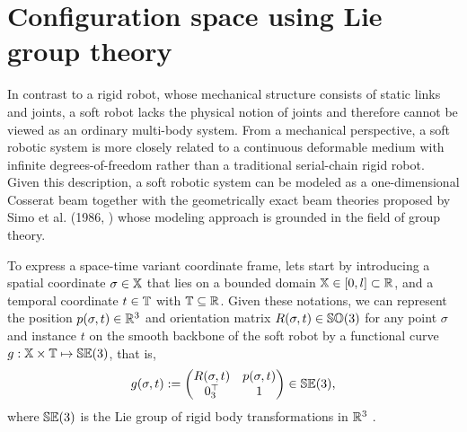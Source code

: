 \section{Configuration space using Lie group theory}
In contrast to a rigid robot, whose mechanical structure consists of static links and joints, a soft robot lacks the physical notion of joints and therefore cannot be viewed as an ordinary multi-body system. From a mechanical perspective, a soft robotic system is more closely related to a continuous deformable medium with infinite degrees-of-freedom rather than a traditional serial-chain rigid robot. Given this description, a soft robotic system can be modeled as a one-dimensional Cosserat beam together with the geometrically exact beam theories proposed by Simo et al. (1986, \cite{Simo1986}) whose modeling approach is grounded in the field of group theory. 

To express a space-time variant coordinate frame, lets start by introducing a spatial coordinate $\sigma \in \mathbb{X}$ that lies on a bounded domain $\mathbb{X} \in [0, l] \subset \mathbb{R}$, and a temporal coordinate $t \in \mathbb{T}$ with $\mathbb{T} \subseteq \mathbb{R}$. Given these notations, we can represent the position $p(\sigma,t) \in \mathbb{R}^3$ and orientation matrix $R(\sigma,t) \in {\mathbb{SO}(3)}$ for any point $\sigma$ and instance $t$ on the smooth backbone of the soft robot by a functional curve $g: \mathbb{X} \times \mathbb{T} \mapsto {\mathbb{SE}(3)}$, that is, 
\begin{equation}
g(\sigma,t) := \begin{pmatrix}
{R}(\sigma,t) & p(\sigma,t) \\ 0_{3}^\top & 1 
\end{pmatrix} \in {\mathbb{SE}(3)},
\label{eq:g}
\end{equation}
where ${\mathbb{SE}(3)}$ is the Lie group of rigid body transformations in $\mathbb{R}^3$ \cite{Murray1994,Spong2006}. 

